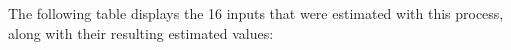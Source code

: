 \documentclass[12pt]{article}
\begin{document}


The following table displays the 16 inputs that were estimated with this process, along with their resulting estimated values: 
\end{document}
